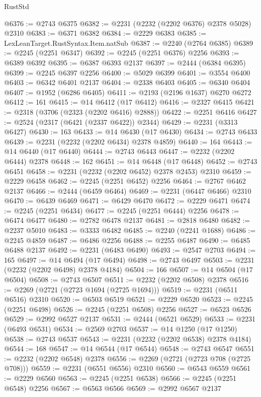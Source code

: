 \begin{lexlean}{RustStd}
\begin{coremodule}
@6376 := @2743 @6375
@6382 := @2231 (@2232 (@2202 @6376) @2378 @5028) @2310
@6383 := @6371 @6382
@6384 := @2229 @6383
@6385 := LexLeanTarget.RustSyntax.Item.natSub
@6387 := @2240 (@2764 @6385)
@6389 := @2245 (@2251 @6347)
@6392 := @2245 (@2251 @6376) @2256
@6393 := @6389 @6392
@6395 := @6387 @6393 @2137
@6397 := @2444 (@6384 @6395)
@6399 := @2245 @6397 @2256
@6400 := @5029 @6399
@6401 := @3554 @6400
@6403 := @6342 @6401 @2137
@6404 := @2338 @6403
@6405 := @6340 @6404
@6407 := @1952 (@6286 @6405)
@6411 := @2193 (@2196 @1637) @6270 @6272
@6412 := 161
@6415 := @14 @6412 (@17 @6412)
@6416 := @2327 @6415
@6421 := @2318 (@3706 (@2323 (@2202 @6416) @2888))
@6422 := @2251 @6416
@6427 := @2524 (@2317 (@6421 (@2337 @6422)) @2344)
@6429 := @2231 (@3313 @6427)
@6430 := 163
@6433 := @14 @6430 (@17 @6430)
@6434 := @2743 @6433
@6439 := @2231 (@2232 (@2202 @6434) @2378 @4859)
@6440 := 164
@6443 := @14 @6440 (@17 @6440)
@6444 := @2743 @6443
@6447 := @2232 (@2202 @6444) @2378
@6448 := 162
@6451 := @14 @6448 (@17 @6448)
@6452 := @2743 @6451
@6458 := @2231 (@2232 (@2202 @6452) @2378 @2453) @2310
@6459 := @2229 @6458
@6462 := @2245 (@2251 @6452) @2256
@6464 := @2767 @6462 @2137
@6466 := @2444 (@6459 @6464)
@6469 := @2231 (@6447 @6466) @2310
@6470 := @6439 @6469
@6471 := @6429 @6470
@6472 := @2229 @6471
@6474 := @2245 (@2251 @6434)
@6477 := @2245 (@2251 @6444) @2256
@6478 := @6474 @6477
@6480 := @2782 @6478 @2137
@6481 := @2818 @6480
@6482 := @2237 @5010
@6483 := @3333 @6482
@6485 := @2240 (@2241 @1688)
@6486 := @2245 @4859
@6487 := @6486 @2256
@6488 := @2255 @6487
@6490 := @6485 @6488 @2137
@6492 := @2231 (@6483 @6490)
@6493 := @2547 @2703
@6494 := 165
@6497 := @14 @6494 (@17 @6494)
@6498 := @2743 @6497
@6503 := @2231 (@2232 (@2202 @6498) @2378 @4184)
@6504 := 166
@6507 := @14 @6504 (@17 @6504)
@6508 := @2743 @6507
@6511 := @2232 (@2202 @6508) @2378
@6516 := @2269 (@2721 (@2723 @1694 (@2725 @1694)))
@6519 := @2231 (@6511 @6516) @2310
@6520 := @6503 @6519
@6521 := @2229 @6520
@6523 := @2245 (@2251 @6498)
@6526 := @2245 (@2251 @6508) @2256
@6527 := @6523 @6526
@6529 := @2992 @6527 @2137
@6531 := @2444 (@6521 @6529)
@6533 := @2231 (@6493 @6531)
@6534 := @2569 @2703
@6537 := @14 @1250 (@17 @1250)
@6538 := @2743 @6537
@6543 := @2231 (@2232 (@2202 @6538) @2378 @4184)
@6544 := 168
@6547 := @14 @6544 (@17 @6544)
@6548 := @2743 @6547
@6551 := @2232 (@2202 @6548) @2378
@6556 := @2269 (@2721 (@2723 @708 (@2725 @708)))
@6559 := @2231 (@6551 @6556) @2310
@6560 := @6543 @6559
@6561 := @2229 @6560
@6563 := @2245 (@2251 @6538)
@6566 := @2245 (@2251 @6548) @2256
@6567 := @6563 @6566
@6569 := @2992 @6567 @2137

\end{coremodule}
\end{lexlean}
